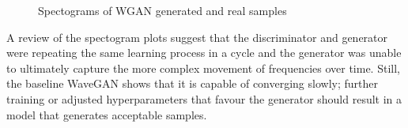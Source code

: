 \documentclass[a4paper, titlepage]{article}
\begin{document}
%
\newline
\begin{figure}[ht]%
    \centering
    \qquad
    \qquad
    \qquad
    \caption{Spectograms of WGAN generated and real samples}%
    \label{fig:WGAN-Specs}%
\end{figure}
%
\newline
A review of the spectogram plots suggest that the discriminator and generator were repeating the same learning process in a cycle and the generator was unable to ultimately capture the more complex movement of frequencies over time.
Still, the baseline WaveGAN shows that it is capable of converging slowly; further training or adjusted hyperparameters that favour the generator should result in a model that generates acceptable samples.
\end{document}
